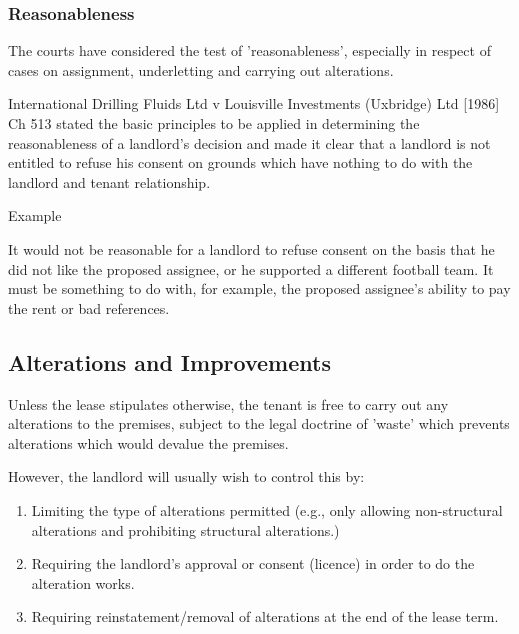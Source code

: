 \documentclass[
]{article}
\providecommand{\tightlist}{%
  \setlength{\itemsep}{0pt}\setlength{\parskip}{0pt}}
\newenvironment{env-8fa37bb4-768d-4893-9e93-b3dc64db7fb6}
{
    \savenotes\tcolorbox[blanker,breakable,left=5pt,borderline west={2pt}{-4pt}{purple}]
}
{
    \endtcolorbox\spewnotes
}
\begin{document}
\hypertarget{reasonableness}{%
\subsubsection{Reasonableness}\label{reasonableness}}

The courts have considered the test of 'reasonableness', especially in
respect of cases on assignment, underletting and carrying out
alterations.

International Drilling Fluids Ltd v Louisville Investments (Uxbridge)
Ltd {[}1986{]} Ch 513 stated the basic principles to be applied in
determining the reasonableness of a landlord's decision and made it
clear that a landlord is not entitled to refuse his consent on grounds
which have nothing to do with the landlord and tenant relationship.

\begin{env-8fa37bb4-768d-4893-9e93-b3dc64db7fb6}

Example

It would not be reasonable for a landlord to refuse consent on the basis
that he did not like the proposed assignee, or he supported a different
football team. It must be something to do with, for example, the
proposed assignee's ability to pay the rent or bad references.

\end{env-8fa37bb4-768d-4893-9e93-b3dc64db7fb6}

\hypertarget{alterations-and-improvements}{%
\subsection{Alterations and
Improvements}\label{alterations-and-improvements}}

Unless the lease stipulates otherwise, the tenant is free to carry out
any alterations to the premises, subject to the legal doctrine of
'waste' which prevents alterations which would devalue the premises.

However, the landlord will usually wish to control this by:

\begin{enumerate}
\tightlist
\item
  Limiting the type of alterations permitted (e.g., only allowing
  non-structural alterations and prohibiting structural alterations.)
\item
  Requiring the landlord's approval or consent (licence) in order to do
  the alteration works.
\item
  Requiring reinstatement/removal of alterations at the end of the lease
  term.
\end{enumerate}
\end{document}
